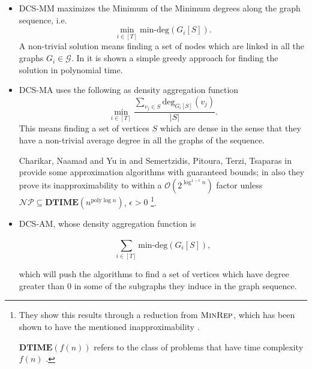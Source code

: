 \begin{itemize}
	\item \acrshort{DCS}-MM maximizes the Minimum of the Minimum degrees along
	      the graph sequence, i.e.
	      \begin{equation}
		      \label{eq:dcs-mm}
		      \min_{i \in [T]} \text{min-deg} (G_i[S]).
	      \end{equation}
	      A non-trivial solution means finding a set of nodes which are linked
	      in all the graphs $G_i \in \mathcal{G} $.
	      In \cite{semertzidis2019finding} it is shown a simple greedy approach
	      for finding the solution in polynomial time.
	\item \acrshort{DCS}-MA uses the following as density aggregation function
	      \begin{equation}
		      \label{eq:dcs-ma}
		      \min_{i \in [T]}
		      \frac{\sum^{}_{v_{j} \in S } \text{deg}_{G_i[S]} (v_{j} )}{|S|}.
	      \end{equation}
	      This means finding a set of vertices $S$ which are dense in the sense
	      that they have a non-trivial average degree in all the graphs of the
	      sequence.


	      Charikar, Naamad and Yu in \cite{charikar2018finding} and
	      Semertzidis, Pitoura, Terzi, Tsaparas in
	      \cite{semertzidis2019finding} provide some
	      approximation algorithms with guaranteed bounds;
	      in \cite{charikar2018finding} also they prove its
	      inapproximability to within a $\mathcal{O}(2 ^{\log^{1-\epsilon} n} )
	      $ factor unless $\mathcal{NP} \subseteq \mathbf{DTIME} (n
		      ^{\text{poly}\log n} ) $, $\epsilon > 0$
	      \footnote{They show this results through a reduction from
	      $\textsc{MinRep}$, which has been shown to have the mentioned
	      inapproximability \cite{charikar2018finding}\cite{kortsarz2001hardness}.

	      $ \mathbf{DTIME}(f(n)) $ refers to the class of problems that
	      have time complexity $f(n)$ \cite{9780521884730}.
	      }.
	\item \acrshort{DCS}-AM, whose density aggregation function is

	      \begin{equation}
		      \label{eq:dcs-am}
		      \sum^{}_{i \in [T]} \text{min-deg} (G_i [S]),
	      \end{equation}

	      which will push the algorithms to find a set of vertices which have
	      degree greater than $0$ in some of the subgraphs they induce in the
	      graph sequence.


\end{itemize}
